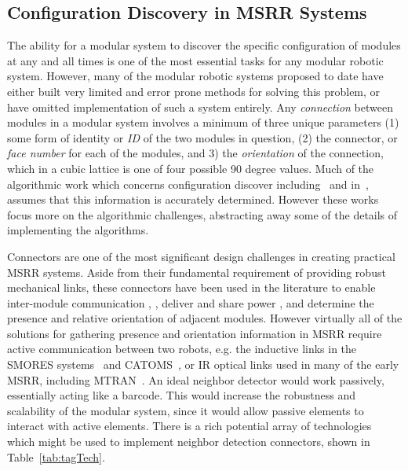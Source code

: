 \subsection{Configuration Discovery in MSRR Systems}
\label{ssec:RWconfiguration}
The ability for a modular system to discover the specific configuration of modules at any and all times is one of the most essential tasks for any modular robotic system. However, many of the modular robotic systems proposed to date have either built very limited and error prone methods for solving this problem, or have omitted implementation of such a system entirely. Any \textit{connection} between modules in a modular system involves a minimum of three unique parameters (1) some form of identity or \textit{ID} of the two modules in question, (2) the connector, or \textit{face number} for each of the modules, and 3) the \textit{orientation} of the connection, which in a cubic lattice is one of four possible 90 degree values. Much of the algorithmic work which concerns configuration discover including~\cite{park2008automatic} and in~\cite{Funiak-IJRR09}, assumes that this information is accurately determined. However these works focus more on the algorithmic challenges, abstracting away some of the details of implementing the algorithms.

Connectors are one of the most significant design challenges in creating practical MSRR systems. Aside from their fundamental requirement of providing robust mechanical links, these connectors have been used in the literature to enable inter-module communication \cite{liedke2013collective}, \cite{TosunDaveyLiuYim-IROS2016}, deliver and share power \cite{OptimalPowerSharing2016}, and determine the presence and relative orientation of adjacent modules. However virtually all of the solutions for gathering presence and orientation information in MSRR require active communication between two robots, e.g. the inductive links in the SMORES systems~\cite{TosunDaveyLiuYim-IROS2016} and CATOMS~\cite{Kirby-IROS07}, or IR optical links used in many of the early MSRR, including MTRAN~\cite{Kurokawa-IJRR08}. An ideal neighbor detector would work passively, essentially acting like a barcode. This would increase the robustness and scalability of the modular system, since it would allow passive elements to interact with active elements. There is a rich potential array of technologies which might be used to implement neighbor detection connectors, shown in Table~\ref{tab:tagTech}.

